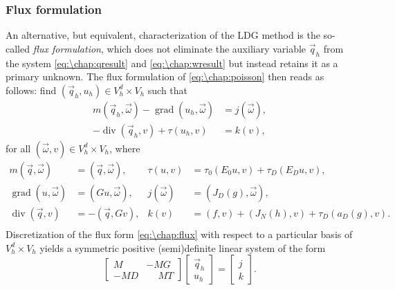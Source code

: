 \subsubsection{Flux formulation}
An alternative, but equivalent, characterization of the LDG method is the so-called \emph{flux formulation}, which does not eliminate the auxiliary variable $\vec{q}_h$ from the system \cref{eq:\chap:qresult} and \cref{eq:\chap:wresult} but instead retains it as a primary unknown. The flux formulation of \cref{eq:\chap:poisson} then reads as follows: find $(\vec{q}_h,u_h) \in V_h^d \times V_h$ such that
\begin{equation}\label{eq:\chap:flux}
\begin{aligned}
m(\vec{q}_h,\vec{\omega}) - \operatorname{grad}(u_h,\vec{\omega}) &= j(\vec{\omega}), \\
-\operatorname{div}(\vec{q}_h,v) + \tau(u_h,v) &= k(v),
\end{aligned}
\end{equation}
for all $(\vec{\omega}, v) \in V_h^d \times V_h$, where
\begin{align*}
m(\vec{q},\vec{\omega}) &= (\vec{q},\vec{\omega}), &\tau(u,v) &= \tau_0 (E_0 u,v) + \tau_D (E_D u, v), \\
\operatorname{grad}(u,\vec{\omega}) &= (Gu,\vec{\omega}), &j(\vec{\omega}) &= (J_D(g),\vec{\omega}), \\
\operatorname{div}(\vec{q},v) &= -(\vec{q},Gv), &k(v) &= (f,v) + (J_N(h),v) + \tau_D (a_D(g),v). \\
\end{align*}
Discretization of the flux form \cref{eq:\chap:flux} with respect to a particular basis of $V_h^d \times V_h$ yields a symmetric positive (semi)definite linear system of the form
\begin{equation}\label{eq:\chap:LDG_block}
\begin{bmatrix}
 M   & -M G \\[.2em]
-M D & \phantom{-}M T
\end{bmatrix}
\begin{bmatrix}
\vec{q}_h \\[.2em] u_h
\end{bmatrix}
=
\begin{bmatrix}
j \\[.2em] k
\end{bmatrix}.
\end{equation}
